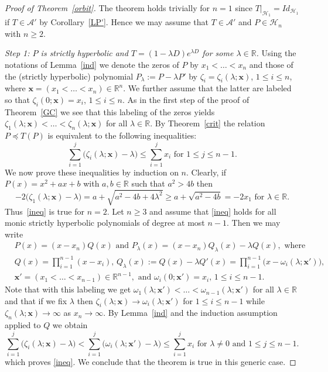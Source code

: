 \documentclass[10pt,twoside,a4paper,reqno]{amsart}
\theoremstyle{plain}
\theoremstyle{definition}
\theoremstyle{remark}
\newcommand {\bR} {\mathbb {R}}
\newcommand {\bx} {\mathbf {x}}
\newcommand {\ze} {\zeta}
\newcommand {\la} {\lambda}
\newcommand {\om} {\omega}
\newcommand {\calH} {\mathcal {H}}
\newcommand {\calA} {\mathcal {A}}
\begin{document}
\begin{proof}[Proof of Theorem~\ref{orbit}]
The theorem holds trivially for $n=1$ since $T|_{\calH_1}=Id_{\calH_1}$ if 
$T\in \calA'$ by Corollary~\ref{LP'}. Hence we may assume that $T\in \calA'$ 
and $P\in \calH_n$ with $n\ge 2$. 

{\em Step 1: $P$ is strictly hyperbolic and $T=(1-\la D)e^{\la D}$ for some 
$\la\in \bR$.} Using the notations of Lemma~\ref{ind} we denote the zeros of 
$P$ by $x_1<\ldots<x_n$ and those of the (strictly hyperbolic) polynomial 
$P_{\la}:=P-\la P'$ by $\ze_i=\ze_{i}(\la;\bx)$, $1\le i\le n$, where 
$\bx=(x_1<\ldots<x_n)\in \bR^n$. We further assume that the latter are 
labeled so that $\ze_{i}(0;\bx)=x_i$, $1\le i\le n$. As in the first step   
of the proof of Theorem~\ref{GC} we see that this labeling of the zeros yields 
$\ze_{1}(\la;\bx)<\ldots<\ze_{n}(\la;\bx)$ for all $\la\in \bR$. By 
Theorem~\ref{crit} the relation $P\preccurlyeq T(P)$ is equivalent to 
the following inequalities:
\begin{equation}\label{ineq}
\sum_{i=1}^{j}\big(\ze_{i}(\la;\bx)-\la\big)\le \sum_{i=1}^{j}x_i\text{ for }
1\le j\le n-1.
\end{equation}
We now prove these inequalities by induction on $n$. Clearly, if 
$P(x)=x^2+ax+b$ with $a,b\in \bR$ such that $a^2>4b$ then 
$$-2\big(\ze_1(\la;\bx)-\la\big)=a+\sqrt{a^2-4b+4\la^2}\ge a+\sqrt{a^2-4b}
=-2x_1\text{ for }\la\in \bR.$$
Thus~\eqref{ineq} is true for $n=2$. Let $n\ge 3$ and assume that 
\eqref{ineq} holds for all monic strictly hyperbolic polynomials of degree at 
most $n-1$. Then we may write
\begin{equation*}
\begin{split}
& P(x)=(x-x_n)Q(x)\text{ and }P_{\la}(x)=(x-x_n)Q_{\la}(x)-\la Q(x),
\text{ where}\\
& Q(x)=\prod_{i=1}^{n-1}(x-x_i),\,Q_{\la}(x):=Q(x)-\la Q'(x)=
\prod_{i=1}^{n-1}\big(x-\om_{i}(\la;\bx')\big),\\
& \bx'=(x_1<\ldots<x_{n-1})\in \bR^{n-1}, \text{ and }\om_{i}(0;\bx')=x_i, 
\,1\le i\le n-1.
\end{split}
\end{equation*}
Note that with this labeling we get
$\om_{1}(\la;\bx')<\ldots<\om_{n-1}(\la;\bx')$ for all $\la\in\bR$ and that if 
we fix $\la$ then $\ze_{i}(\la;\bx)\rightarrow \om_{i}(\la;\bx')$ for  
$1\le i\le n-1$ while $\ze_{n}(\la;\bx)\rightarrow \infty$ as 
$x_n\rightarrow \infty$. By Lemma~\ref{ind} and the 
induction assumption applied to $Q$ we obtain
$$\sum_{i=1}^{j}\big(\ze_{i}(\la;\bx)-\la\big)< 
\sum_{i=1}^{j}\big(\om_{i}(\la;\bx')-\la\big)\le 
\sum_{i=1}^{j}x_i\text{ for }\la\neq 0\text{ and }1\le j\le n-1.$$
which proves \eqref{ineq}. We conclude that the theorem is true in this 
generic case.


\end{proof}
\end{document}
